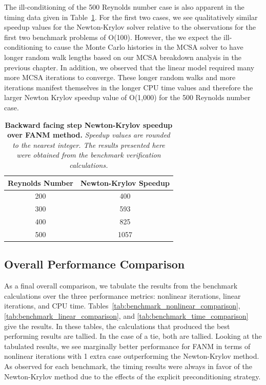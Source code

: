 The ill-conditioning of the 500 Reynolds number case is also apparent
in the timing data given in
Table~\ref{tab:step_speedup_comparison}. For the first two cases, we
see qualitatively similar speedup values for the Newton-Krylov solver
relative to the observations for the first two benchmark problems of
O(100). However, the we expect the ill-conditioning to cause the Monte
Carlo histories in the MCSA solver to have longer random walk lengths
based on our MCSA breakdown analysis in the previous chapter. In
addition, we observed that the linear model required many more MCSA
iterations to converge. These longer random walks and more iterations
manifest themselves in the longer CPU time values and therefore the
larger Newton Krylov speedup value of O(1,000) for the 500 Reynolds
number case.

\begin{table}[h!]
  \begin{center}
    \begin{tabular}{cc}\hline\hline
      \multicolumn{1}{c}{Reynolds Number}& 
      \multicolumn{1}{c}{Newton-Krylov Speedup}\\
      \hline
      200 & 400 \\
      300 & 593 \\
      400 & 825 \\
      500 & 1057 \\
      \hline\hline
    \end{tabular}
  \end{center}
  \caption{\textbf{Backward facing step Newton-Krylov speedup
      over FANM method.} \textit{Speedup values are rounded to the
      nearest integer. The results presented here were obtained from
      the benchmark verification calculations.}}
  \label{tab:step_speedup_comparison}
\end{table}


\subsection{Overall Performance Comparison}
\label{subsec:nonlinear_overall_comparison}

As a final overall comparison, we tabulate the results from the
benchmark calculations over the three performance metrics: nonlinear
iterations, linear iterations, and CPU
time. Tables~\ref{tab:benchmark_nonlinear_comparison},
\ref{tab:benchmark_linear_comparison}, and
\ref{tab:benchmark_time_comparison} give the results. In these tables,
the calculations that produced the best performing results are
tallied. In the case of a tie, both are tallied. Looking at the
tabulated results, we see marginally better performance for FANM in
terms of nonlinear iterations with 1 extra case outperforming the
Newton-Krylov method. As observed for each benchmark, the timing
results were always in favor of the Newton-Krylov method due to the
effects of the explicit preconditioning strategy.

